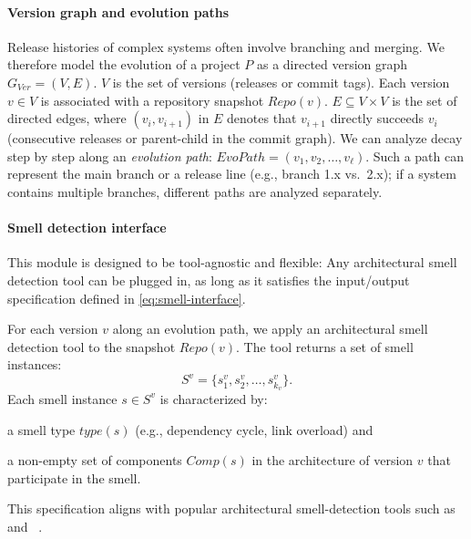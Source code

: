 \paragraph{Version graph and evolution paths}
Release histories of complex systems often involve branching and merging.
We therefore model the evolution of a project $P$ as a directed version graph $ G_{Ver} = (V, E)$.
$V$ is the set of versions (releases or commit tags). Each version $v \in V$ is associated with a repository snapshot $Repo(v)$.
$E \subseteq V \times V$ is the set of directed edges, where $(v_i,v_{i+1})$ in $E$ denotes that $v_{i+1}$ directly succeeds $v_i$ (consecutive releases or parent-child in the commit graph).
We can analyze decay step by step along an \emph{evolution path}: $EvoPath = (v_1, v_2, \dots, v_\ell )$.
Such a path can represent the main branch or a release line (e.g., branch 1.x vs.\ 2.x);
if a system contains multiple branches, different paths are analyzed separately.


\paragraph{Smell detection interface}
\label{para:smell-interface}
This module is designed to be tool-agnostic and flexible:
Any architectural smell detection tool can be plugged in, as long as it satisfies the input/output specification defined in \autoref{eq:smell-interface}.

For each version $v$ along an evolution path, we apply an architectural smell detection tool to the snapshot $\mathit{Repo}(v)$.
The tool returns a set of smell instances:
\begin{equation}
    S^v = \{ s_1^v, s_2^v, \dots, s_{k_v}^v \}.
    \label{eq:smell-interface}
\end{equation}
Each smell instance $s \in S^v$ is characterized by:
\begin{enumerate*}[label=(\roman*)]
    \item a smell type $\mathit{type}(s)$ (e.g., dependency cycle, link overload) and
    \item a non-empty set of components $\mathit{Comp}(s)$ in the architecture of version $v$ that participate in the smell.
\end{enumerate*}
This specification aligns with popular architectural smell-detection tools such as \ARCADE~\cite{schmittlaser_ARCADEExtensible_2020} and \Arcan~\cite{sas_ArchitecturalTechnical_2023}.

